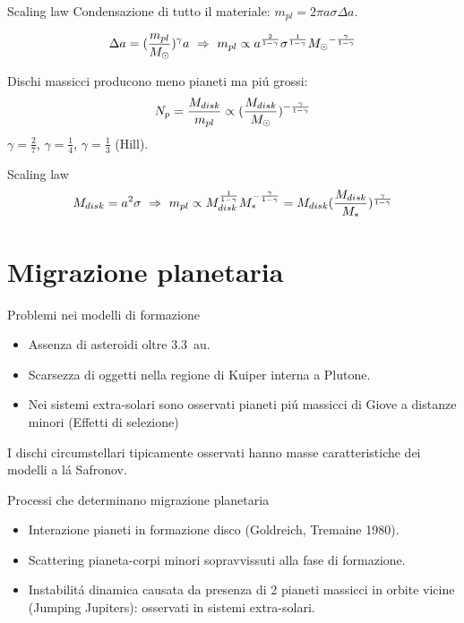 \begin{frame}{Scaling law}
Condensazione di tutto il materiale: $m_{pl}=2\pi a\sigma\Delta a$.

\begin{equation*}
\Delta a=(\frac{m_{pl}}{M_{\odot}})^{\gamma}a\ \Rightarrow\ m_{pl}\propto a^{\frac{2}{1-\gamma}}\sigma^{\frac{1}{1-\gamma}}M_{\odot}{}^{-\frac{\gamma}{1-\gamma}}
\end{equation*}

Dischi massicci producono meno pianeti ma pi\'u grossi:
\begin{equation*}
N_p=\frac{M_{disk}}{m_{pl}}\propto(\frac{M_{disk}}{M_{\odot}{}})^{-\frac{\gamma}{1-\gamma}}
\end{equation*}
$\gamma=\frac{2}{7}$, $\gamma=\frac{1}{4}$, $\gamma=\frac{1}{3}$ (Hill).

\end{frame}

\begin{wordonframe}{Scaling law}
\begin{equation*}
M_{disk}=a^2\sigma\ \Rightarrow\ m_{pl}\propto M_{disk}^{\frac{1}{1-\gamma}}M_*^{-\frac{\gamma}{1-\gamma}}=M_{disk}(\frac{M_{disk}}{M_*})^{\frac{\gamma}{1-\gamma}}
\end{equation*}
\end{wordonframe}

\section{Migrazione planetaria}

\begin{frame}{Problemi nei modelli di formazione}
\begin{itemize}
\item Assenza di asteroidi oltre \SI{3.3}{\astronomicalunit}.
\item Scarsezza di oggetti nella regione di Kuiper interna a Plutone.
\item Nei sistemi extra-solari sono osservati pianeti pi\'u massicci di Giove a distanze minori (Effetti di selezione)
\end{itemize}
I dischi circumstellari tipicamente osservati hanno masse caratteristiche dei modelli a l\'a Safronov.
\end{frame}

\begin{frame}{Processi che determinano migrazione planetaria}

\begin{itemize}
\item Interazione pianeti in formazione disco (Goldreich, Tremaine 1980).
\item Scattering pianeta-corpi minori sopravvissuti alla fase di formazione.
\item Instabilit\'a dinamica causata da presenza di 2 pianeti massicci in orbite vicine (Jumping Jupiters): osservati in sistemi extra-solari.
\end{itemize}

\end{frame}

